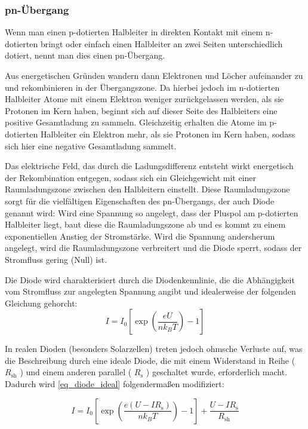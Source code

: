 \documentclass[
	a4paper,
	12pt,
	pagesize,
	ngerman
]{scrartcl}
\begin{document}
	\subsubsection{pn-Übergang}
	Wenn man einen p-dotierten Halbleiter in direkten Kontakt mit einem n-dotierten bringt oder einfach einen Halbleiter an zwei Seiten unterschiedlich dotiert, nennt man dies einen pn-Übergang.

	Aus energetischen Gründen wandern dann Elektronen und Löcher aufeinander zu und rekombinieren in der Übergangszone.
	Da hierbei jedoch im n-dotierten Halbleiter Atome mit einem Elektron weniger zurückgelassen werden, als sie Protonen im Kern haben, beginnt sich auf dieser Seite des Halbleiters eine positive Gesamtladung zu sammeln.
	Gleichzeitig erhalten die Atome im p-dotierten Halbleiter ein Elektron mehr, als sie Protonen im Kern haben, sodass sich hier eine negative Gesamtladung sammelt.

	Das elektrische Feld, das durch die Ladungsdifferenz entsteht wirkt energetisch der Rekombination entgegen, sodass sich ein Gleichgewicht mit einer Raumladungszone zwischen den Halbleitern einstellt.
	Diese Raumladungszone sorgt für die vielfältigen Eigenschaften des pn-Übergangs, der auch Diode genannt wird: %
	Wird eine Spannung so angelegt, dass der Pluspol am p-dotierten Halbleiter liegt, baut diese die Raumladungszone ab und es kommt zu einem exponentiellen Anstieg der Stromstärke.
	Wird die Spannung andersherum angelegt, wird die Raumladungszone verbreitert und die Diode sperrt, sodass der Stromfluss gering (Null) ist.

	Die Diode wird charakterisiert durch die Diodenkennlinie, die die Abhängigkeit vom Stromfluss zur angelegten Spannung angibt und idealerweise der folgenden Gleichung gehorcht:
	\begin{equation}
		\label{eq_diode_ideal}
		I = I_0 \left[ \exp \left( \frac{eU}{n k_B T} \right) -1 \right] %
	\end{equation}

	In realen Dioden (besonders Solarzellen) treten jedoch ohmsche Verluste auf, was die Beschreibung durch eine ideale Diode, die mit einem Widerstand in Reihe ( $ R_\text{sh} $ ) und einem anderen parallel ( $ R_\text{s} $ ) geschaltet wurde, erforderlich macht.
	Dadurch wird \cref{eq_diode_ideal} folgendermaßen modifiziert:

	\begin{equation}
		\label{eq_diode_real}
		I = I_0 \left[ \exp \left( \frac{e (U-I R_\text{s})}{n k_B T} \right) -1 \right] + \frac{U-I R_\text{s}}{R_\text{sh}}%
	\end{equation}
\end{document}
